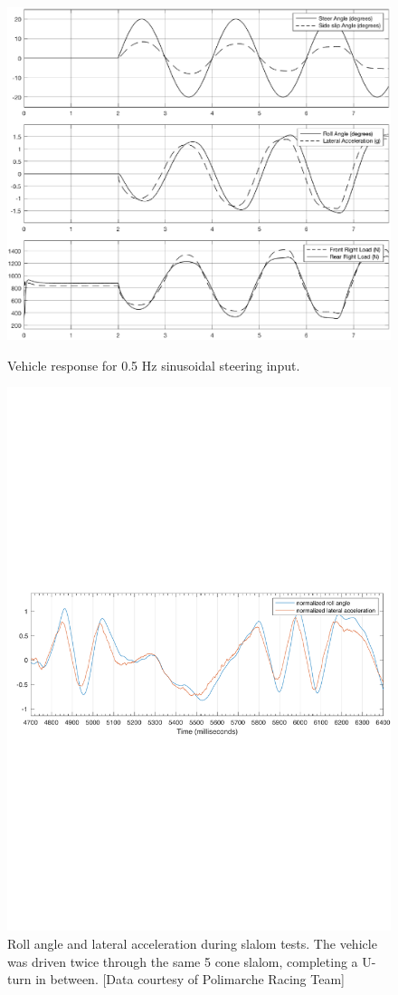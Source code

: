 \begin{figure}[h]
  \centering
  \includegraphics[scale=0.7]{figures/sine}
  \caption{Vehicle response for 0.5 Hz sinusoidal steering input.}
  \label{sine}
  \centering
  \includegraphics[scale=0.6]{figures/telemetry}
  \caption{Roll angle and lateral acceleration during slalom tests. The vehicle was driven twice through the same 5 cone slalom, completing a U-turn in between. [Data courtesy of Polimarche Racing Team]}
  \label{slalom}
\end{figure}

